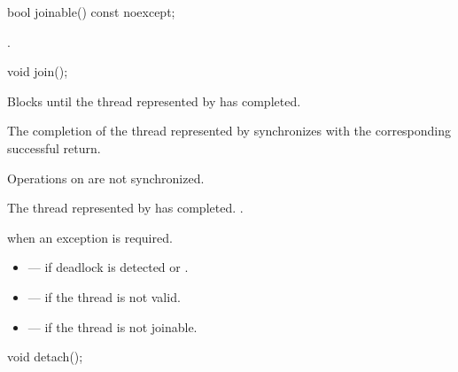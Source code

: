 %
\begin{itemdecl}
bool joinable() const noexcept;
\end{itemdecl}

\begin{itemdescr}
\pnum
\returns
{}.
\end{itemdescr}

%
\begin{itemdecl}
void join();
\end{itemdecl}

\begin{itemdescr}
\pnum
{}%
\effects
Blocks until the thread represented by  has completed.

\pnum
\sync
The completion of the thread represented by  synchronizes with
the corresponding successful
 return.
\begin{note}
Operations on
 are not synchronized.
\end{note}

\pnum
\ensures
The thread represented by  has completed. .

\pnum
\throws
{} when
an exception is required.

\pnum
\errors
\begin{itemize}
\item {} --- if deadlock is detected or
.

\item {} --- if the thread is not valid.

\item {} --- if the thread is not joinable.
\end{itemize}
\end{itemdescr}

%
\begin{itemdecl}
void detach();
\end{itemdecl}

